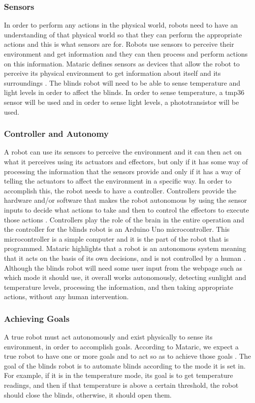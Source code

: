 \documentclass[10pt,twocolumn]{article}
\begin{document}
\subsubsection{Sensors}
In order to perform any actions in the physical world, robots need to have an understanding of that physical world so that they can perform the appropriate actions and this is what sensors are for. Robots use sensors to perceive their environment and get information and they can then process and perform actions on this information. Mataric defines sensors as devices that allow the robot to perceive its physical environment to get information about itself and its surroundings \cite{Mataric2007TheRoboticsPrimer}. The blinds robot will need to be able to sense temperature and light levels in order to affect the blinds. In order to sense temperature, a tmp36 sensor will be used and in order to sense light levels, a phototransistor will be used.

\subsubsection{Controller and Autonomy}
A robot can use its sensors to perceive the environment and it can then act on what it perceives using its actuators and effectors, but only if it has some way of processing the information that the sensors provide and only if it has a way of telling the actuators to affect the environment in a specific way. In order to accomplish this, the robot needs to have a controller. Controllers provide the hardware and/or software that makes the robot autonomous by using the sensor inputs to decide what actions to take and then to control the effectors to execute those actions \cite{Mataric2007TheRoboticsPrimer}. Controllers play the role of the brain in the entire operation and the controller for the blinds robot is an Arduino Uno microcontroller. This microcontroller is a simple computer and it is the part of the robot that is programmed. Mataric highlights that a robot is an autonomous system meaning that it acts on the basis of its own decisions, and is not controlled by a human \cite{Mataric2007TheRoboticsPrimer}. Although the blinds robot will need some user input from the webpage such as which mode it should use, it overall works autonomously, detecting sunlight and temperature levels, processing the information, and then taking appropriate actions, without any human intervention.

\subsubsection{Achieving Goals}
A true robot must act autonomously and exist physically to sense its environment, in order to accomplish goals. According to Mataric, we expect a true robot to have one or more goals and to act so as to achieve those goals \cite{Mataric2007TheRoboticsPrimer}. The goal of the blinds robot is to automate blinds according to the mode it is set in. For example, if it is in the temperature mode, its goal is to get temperature readings, and then if that temperature is above a certain threshold, the robot should close the blinds, otherwise, it should open them.
\end{document}

